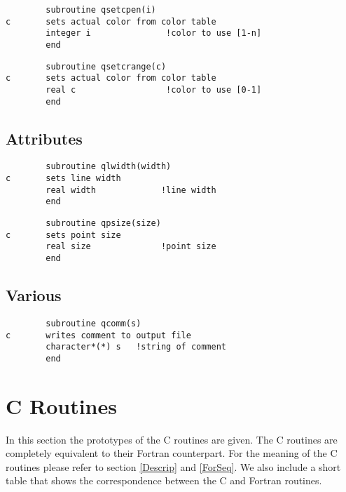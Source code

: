 \documentclass{article}
\begin{document}
\begin{verbatim}
        subroutine qsetcpen(i)
c       sets actual color from color table
        integer i               !color to use [1-n]
        end
\end{verbatim}

\begin{verbatim}
        subroutine qsetcrange(c)
c       sets actual color from color table
        real c                  !color to use [0-1]
        end
\end{verbatim}


\subsection{Attributes}


\begin{verbatim}
        subroutine qlwidth(width)
c       sets line width
        real width             !line width
        end
\end{verbatim}

\begin{verbatim}
        subroutine qpsize(size)
c       sets point size
        real size              !point size
        end
\end{verbatim}


\subsection{Various}


\begin{verbatim}
        subroutine qcomm(s)
c       writes comment to output file
        character*(*) s   !string of comment
        end
\end{verbatim}


\section{C Routines}

\label{CSeq}

In this section the prototypes of the C routines are given.
The C routines are completely equivalent to their Fortran counterpart.
For the meaning of the C routines please refer to section \ref{Descrip}
and \ref{ForSeq}. We also include a short table that shows the 
correspondence between the C and Fortran routines.

\DeleteShortVerb{\|}
\end{document}

